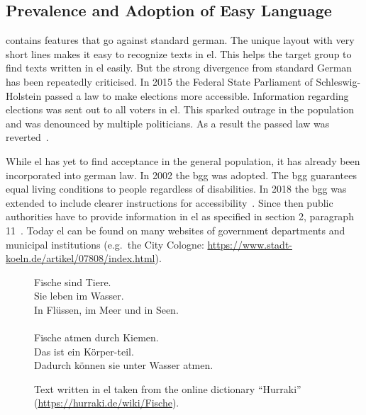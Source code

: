 \subsection{Prevalence and Adoption of Easy Language}\label{subsec:el-adop}

 contains features that go against standard german.
The unique layout with very short lines makes it easy to recognize texts in \gls{el}.
This helps the target group to find texts written in \gls{el} easily.
But the strong divergence from standard German has been repeatedly criticised.
In 2015 the Federal State Parliament of Schleswig-Holstein passed a law to make elections more accessible.
Information regarding elections was sent out to all voters in \gls{el}.
This sparked outrage in the population and was denounced by multiple politicians.
As a result the passed law was reverted~\autocite{easyLanguageBook}.

While \gls{el} has yet to find acceptance in the general population, it has already been incorporated into german law.
In 2002 the \gls{bgg} was adopted.
The \gls{bgg} guarantees equal living conditions to people regardless of disabilities.
In 2018 the \gls{bgg} was extended to include clearer instructions for accessibility~\autocite{bggInfo}.
Since then public authorities have to provide information in \gls{el} as specified in section 2, paragraph 11~\autocite{bgg2018}.
Today \gls{el} can be found on many websites of government departments and municipal institutions (e.g.\ the City Cologne: \url{https://www.stadt-koeln.de/artikel/07808/index.html}).

\begin{figure}
    \centering
    \colorbox{goodgreen!20}{
        \begin{minipage}{0.6\textwidth}
            Fische sind Tiere. \\
            Sie leben im Wasser. \\
            In Flüssen, im Meer und in Seen. \\
            \\
            Fische atmen durch Kiemen. \\
            Das ist ein Körper-teil. \\
            Dadurch können sie unter Wasser atmen.
        \end{minipage}
    }
    \caption[Text written in .]{Text written in \gls{el} taken from the online dictionary \enquote{Hurraki} (\url{https://hurraki.de/wiki/Fische}).}
    \label{fig:easy_text}
\end{figure}


